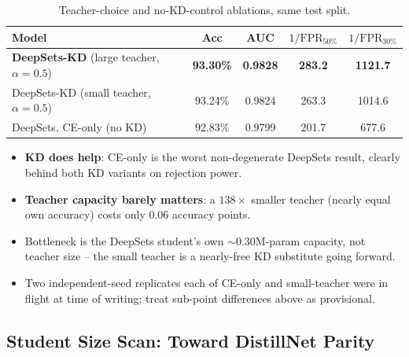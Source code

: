 \begin{table}[h]
    \centering
    \small
    \begin{tabular}{lcccc}
        \toprule
        Model & Acc & AUC & $1/\mathrm{FPR}_{50\%}$ & $1/\mathrm{FPR}_{30\%}$ \\
        \midrule
        \textbf{DeepSets-KD} (large teacher, $\alpha{=}0.5$) & \textbf{93.30\%} & \textbf{0.9828} & \textbf{283.2} & \textbf{1121.7} \\
        DeepSets-KD (small teacher, $\alpha{=}0.5$)          & 93.24\% & 0.9824 & 263.3 & 1014.6 \\
        DeepSets, CE-only (no KD)                             & 92.83\% & 0.9799 & 201.7 & 677.6 \\
        \bottomrule
    \end{tabular}
    \caption{Teacher-choice and no-KD-control ablations, same test split.}
    \label{tab:deepsets-teacher-ablation}
\end{table}

\begin{itemize}
    \item \textbf{KD does help}: CE-only is the worst non-degenerate
    DeepSets result, clearly behind both KD variants on rejection power.
    \item \textbf{Teacher capacity barely matters}: a $138\times$ smaller
    teacher (nearly equal own accuracy) costs only 0.06 accuracy points.
    \item Bottleneck is the DeepSets student's own $\sim$0.30M-param
    capacity, not teacher size -- the small teacher is a nearly-free KD
    substitute going forward.
    \item Two independent-seed replicates each of CE-only and small-teacher
    were in flight at time of writing; treat sub-point differences above as
    provisional.
\end{itemize}

\subsection{Student Size Scan: Toward DistillNet Parity}
\label{sec:deepsets-size-scan}

